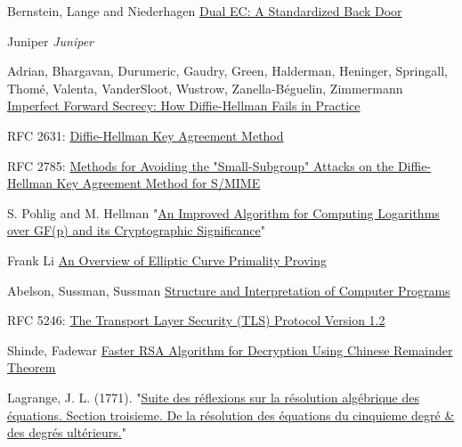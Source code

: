 \documentclass[a4paper,11pt,twocolumn]{article}
\begin{document}
\newpage

\begin{thebibliography}{1}

 Bernstein, Lange and Niederhagen \href{https://eprint.iacr.org/2015/767.pdf}{Dual EC: A Standardized Back Door}

 Juniper {\em Juniper}

 Adrian, Bhargavan, Durumeric, Gaudry, Green, Halderman, Heninger, Springall, Thomé, Valenta,  VanderSloot, Wustrow, Zanella-Béguelin, Zimmermann \href{https://weakdh.org/imperfect-forward-secrecy-ccs15.pdf}{Imperfect Forward Secrecy: How Diffie-Hellman Fails in Practice}

 RFC 2631: \href{https://tools.ietf.org/html/rfc2631}{Diffie-Hellman Key Agreement Method}

 RFC 2785: \href{https://tools.ietf.org/html/rfc2785}{Methods for Avoiding the "Small-Subgroup" Attacks on the Diffie-Hellman Key Agreement Method for S/MIME}

 S. Pohlig and M. Hellman "\href{http://www-ee.stanford.edu/~hellman/publications/28.pdf}{An Improved Algorithm for Computing Logarithms over GF(p) and its Cryptographic Significance}"

 Frank Li \href{http://theory.stanford.edu/~dfreeman/cs259c-f11/finalpapers/primalityproving.pdf}{An Overview of Elliptic Curve Primality Proving}

 Abelson, Sussman, Sussman \href{https://mitpress.mit.edu/sicp/chapter1/footnode.html#2413}{Structure and Interpretation of Computer Programs}

 RFC 5246: \href{https://www.ietf.org/rfc/rfc5246.txt}{The Transport Layer Security (TLS) Protocol Version 1.2}

 Shinde, Fadewar \href{http://www.techscience.com/doi/10.3970/icces.2008.005.255.pdf}{Faster RSA Algorithm for Decryption Using Chinese
Remainder Theorem}

 Lagrange, J. L. (1771). "\href{https://books.google.com/books?id=_-U_AAAAYAAJ&pg=PA138#v=onepage&q&f=false}{Suite des réflexions sur la résolution algébrique des équations. Section troisieme. De la résolution des équations du cinquieme degré & des degrés ultérieurs.}"

\end{thebibliography}
\end{document}
